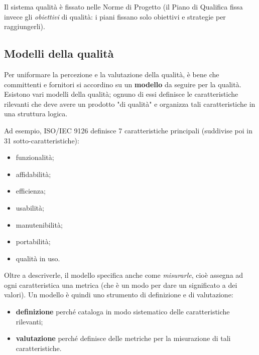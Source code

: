 \documentclass[a4paper]{article}
\begin{document}
		
Il sistema qualità è fissato nelle Norme di Progetto (il Piano di Qualifica fissa invece gli \emph{obiettivi} di qualità: i piani fissano solo obiettivi e strategie per raggiungerli).%


		
	\subsection{Modelli della qualità}

		
Per uniformare la percezione e la valutazione della qualità, è bene che committenti e fornitori si accordino su un \textbf{modello} da seguire per la qualità. Esistono vari modelli della qualità; ognuno di essi definisce le caratteristiche rilevanti che deve avere un prodotto "di qualità" e organizza tali caratteristiche in una struttura logica.
		
Ad esempio, ISO/IEC 9126 definisce 7 caratteristiche principali (suddivise poi in 31 sotto-caratteristiche):
		
	\begin{itemize}
		
			
	\item funzionalità;
			
	\item affidabilità;
			
	\item efficienza;
			
	\item usabilità;
			
	\item manutenibilità;
			
	\item portabilità;
			
	\item qualità in uso.
		
	\end{itemize}

		
Oltre a descriverle, il modello specifica anche come \emph{misurarle}, cioè assegna ad ogni caratteristica una metrica (che è un modo per dare un significato a dei valori). Un modello è quindi uno strumento di definizione e di valutazione:
		
	\begin{itemize}
		
			
	\item \textbf{definizione} perché cataloga in modo sistematico delle caratteristiche rilevanti;
			
	\item \textbf{valutazione} perché definisce delle metriche per la misurazione di tali caratteristiche.
		
	\end{itemize}
\end{document}
